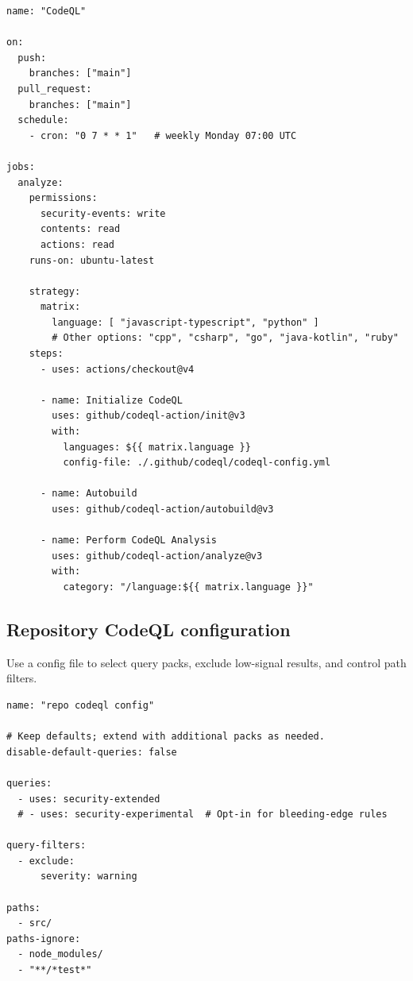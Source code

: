 \documentclass[11pt]{article}
\begin{document}
\begin{listing}[H]
\caption{\texttt{.github/workflows/codeql.yml}}
\begin{verbatim}
name: "CodeQL"

on:
  push:
    branches: ["main"]
  pull_request:
    branches: ["main"]
  schedule:
    - cron: "0 7 * * 1"   # weekly Monday 07:00 UTC

jobs:
  analyze:
    permissions:
      security-events: write
      contents: read
      actions: read
    runs-on: ubuntu-latest

    strategy:
      matrix:
        language: [ "javascript-typescript", "python" ]
        # Other options: "cpp", "csharp", "go", "java-kotlin", "ruby"
    steps:
      - uses: actions/checkout@v4

      - name: Initialize CodeQL
        uses: github/codeql-action/init@v3
        with:
          languages: ${{ matrix.language }}
          config-file: ./.github/codeql/codeql-config.yml

      - name: Autobuild
        uses: github/codeql-action/autobuild@v3

      - name: Perform CodeQL Analysis
        uses: github/codeql-action/analyze@v3
        with:
          category: "/language:${{ matrix.language }}"
\end{verbatim}
\end{listing}
\newpage

\subsection{Repository CodeQL configuration}
Use a config file to select query packs, exclude low-signal results, and control path filters.

\begin{listing}[H]
\caption{\texttt{.github/codeql/codeql-config.yml}}
\begin{verbatim}
name: "repo codeql config"

# Keep defaults; extend with additional packs as needed.
disable-default-queries: false

queries:
  - uses: security-extended
  # - uses: security-experimental  # Opt-in for bleeding-edge rules

query-filters:
  - exclude:
      severity: warning

paths:
  - src/
paths-ignore:
  - node_modules/
  - "**/*test*"
\end{verbatim}
\end{listing}
\end{document}
